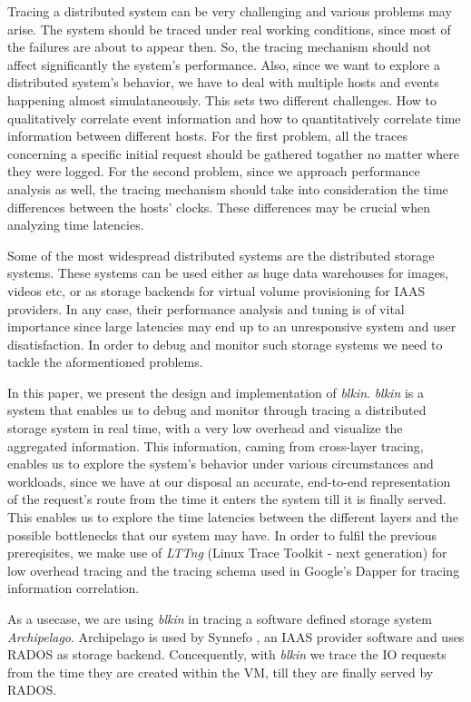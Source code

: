 \documentclass[a4paper,10pt,twocolumn]{article}
\begin{document}
Tracing a distributed system can be very challenging and various 
problems may arise. The system should be traced under real working conditions,
since most of the failures are about to appear then. So, the tracing mechanism
should not affect significantly the system's performance. Also, since we want to
explore a distributed system's behavior, we have to deal with multiple hosts and
events happening almost simulataneously. This sets two different challenges.
How to qualitatively correlate event information and how to quantitatively 
correlate time information between different hosts. For the first problem, all
the traces concerning a specific initial request should be gathered togather
no matter where they were logged. For the second problem, since we approach 
performance analysis as well, the tracing mechanism should take into
consideration the time differences between the hosts' clocks. These differences
may be crucial when analyzing time latencies.

Some of the most widespread distributed systems are the distributed storage
systems. These systems can be used either as huge data warehouses for images,
videos etc, or as storage backends for virtual volume provisioning for IAAS 
providers. In any case, their performance analysis and tuning is of vital
importance since large latencies may end up to an unresponsive system and user
disatisfaction. In order to debug and monitor such storage systems we need to 
tackle the aformentioned problems.

In this paper, we present the design and implementation of \emph{blkin}.
\emph{blkin} is a system that enables us to debug and monitor through tracing
a distributed storage system in real time, with a very low overhead and 
visualize the aggregated information. This information, caming from cross-layer 
tracing, enables us to explore the system's behavior under various circumstances
and workloads, since we have at our disposal an accurate, end-to-end
representation of the request's route from the time it enters the system till
it is finally served. This enables us to explore the time latencies between the
different layers and the possible bottlenecks that our system may have. In order
to fulfil the previous prereqisites, we make use of \emph{LTTng} (Linux Trace 
Toolkit - next generation)\cite{lttng} for low overhead tracing and the tracing
schema used in Google's Dapper for tracing information correlation.

As a usecase, we are using \emph{blkin} in tracing a software defined storage 
system \emph{Archipelago}\cite{archip}. Archipelago is used by Synnefo 
\cite{synnefo}, an IAAS provider software and uses RADOS\cite{rados} as storage
backend. Concequently, with \emph{blkin} we trace the IO requests from the time
they are created within the VM, till they are finally served by RADOS.
\end{document}

